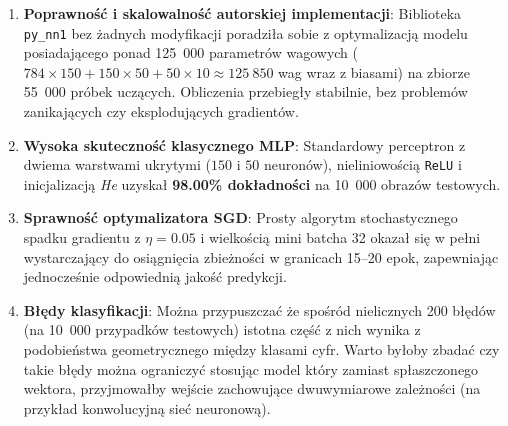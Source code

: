 \documentclass[11pt,a4paper]{article}
\begin{document}
\begin{enumerate}
    \item \textbf{Poprawność i skalowalność autorskiej implementacji}:
    Biblioteka \texttt{py\_nn1} bez żadnych modyfikacji
    poradziła sobie z optymalizacją modelu posiadającego ponad 125~000 parametrów wagowych
    ($784 \times 150 + 150 \times 50 + 50 \times 10 \approx 125~850$ wag wraz z biasami)
    na zbiorze 55~000 próbek uczących. Obliczenia przebiegły stabilnie, bez problemów
    zanikających czy eksplodujących gradientów.
    
    \item \textbf{Wysoka skuteczność klasycznego MLP}:
    Standardowy perceptron z dwiema warstwami ukrytymi ($150$ i $50$ neuronów),
    nieliniowością \texttt{ReLU} i inicjalizacją \textit{He} uzyskał \textbf{98.00\% dokładności}
    na 10~000 obrazów testowych.
    
    \item \textbf{Sprawność optymalizatora SGD}:
    Prosty algorytm stochastycznego spadku gradientu z $\eta = 0.05$
    i wielkością mini batcha 32 okazał się w pełni wystarczający do osiągnięcia zbieżności
    w granicach 15--20 epok, zapewniając jednocześnie odpowiednią jakość predykcji.
    
    \item \textbf{Błędy klasyfikacji}:
    Można przypuszczać że spośród nielicznych 200 błędów (na 10~000 przypadków testowych)
    istotna część z nich wynika z podobieństwa geometrycznego między klasami cyfr.
    Warto byłoby zbadać czy takie błędy można ograniczyć
    stosując model który zamiast spłaszczonego wektora, przyjmowałby wejście zachowujące dwuwymiarowe zależności
    (na przykład konwolucyjną sieć neuronową).
\end{enumerate}
\end{document}
